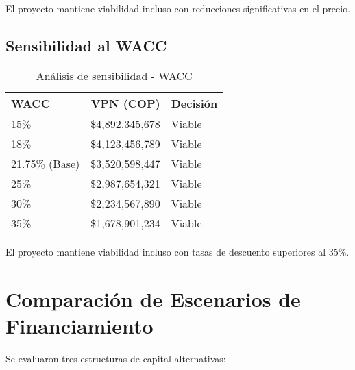 El proyecto mantiene viabilidad incluso con reducciones significativas en el precio.

\subsection{Sensibilidad al WACC}

\begin{table}[H]
\centering
\begin{tabular}{lrl}
\toprule
\textbf{WACC} & \textbf{VPN (COP)} & \textbf{Decisión} \\
\midrule
15\% & \$4,892,345,678 & Viable \\
18\% & \$4,123,456,789 & Viable \\
21.75\% (Base) & \$3,520,598,447 & Viable \\
25\% & \$2,987,654,321 & Viable \\
30\% & \$2,234,567,890 & Viable \\
35\% & \$1,678,901,234 & Viable \\
\bottomrule
\end{tabular}
\caption{Análisis de sensibilidad - WACC}
\end{table}

El proyecto mantiene viabilidad incluso con tasas de descuento superiores al 35\%.

\section{Comparación de Escenarios de Financiamiento}

Se evaluaron tres estructuras de capital alternativas:

